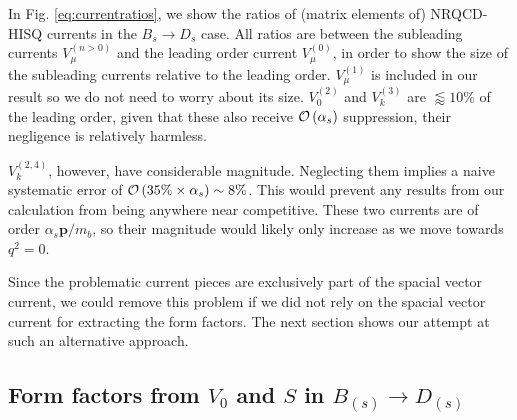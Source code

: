 In Fig. \ref{eq:currentratios}, we show the ratios of (matrix elements of) NRQCD-HISQ currents in the $B_s\to D_s$ case. All ratios are between the subleading currents $V_{\mu}^{(n>0)}$ and the leading order current $V_{\mu}^{(0)}$, in order to show the size of the subleading currents relative to the leading order. $V^{(1)}_{\mu}$ is included in our result so we do not need to worry about its size. $V_0^{(2)}$ and $V_k^{(3)}$ are $\lessapprox 10\%$ of the leading order, given that these also receive $\mathcal{O}\left( \alpha_s \right)$ suppression, their negligence is relatively harmless.

$V_k^{(2,4)}$, however, have considerable magnitude. Neglecting them implies a naive systematic error of $\mathcal{O}\left(  35\% \times \alpha_s  \right) \sim 8\%$. This would prevent any results from our calculation from being anywhere near competitive. These two currents are of order $\alpha_s{\textbf{p}}/m_b$, so their magnitude would likely only increase as we move towards $q^2=0$.

Since the problematic current pieces are exclusively part of the spacial vector current, we could remove this problem if we did not rely on the spacial vector current for extracting the form factors. The next section shows our attempt at such an alternative approach.

\subsection{Form factors from $V_0$ and $S$ in $B_{(s)}\to D_{(s)}$}
\label{sec:fplus_divergence}

